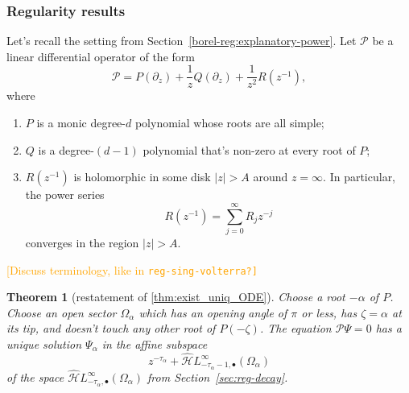 \documentclass{article}
\newcommand{\dualsingexp}[2]{\widehat{\mathcal{H}}L^\infty_{#1, #2}}
\newcommand{\dualsingexpalg}[1]{\dualsingexp{#1}{\bullet}}
\newcommand{\C}{\mathbb{C}}
\theoremstyle{definition}
\theoremstyle{plain}
\newtheorem{theorem}{Theorem}[section]
\begin{document}
\subsubsection{Regularity results}
Let's recall the setting from Section~\ref{borel-reg:explanatory-power}. Let $\mathcal{P}$ be a linear differential operator of the form
\begin{equation}\label{eqn:operator-P}
    \mathcal{P} = P(\partial_z) + \frac{1}{z} Q(\partial_z) + \frac{1}{z^2} R(z^{-1}),
\end{equation}
where
\begin{enumerate}
\item $P$ is a monic degree-$d$ polynomial whose roots are all simple; 
\item $Q$ is a degree-$(d-1)$ polynomial that's non-zero at every root of $P$;
\item $R(z^{-1})$ is holomorphic in some disk $|z| > A$ around $z = \infty$. In particular, the power series
\[ R(z^{-1}) = \sum_{j=0}^\infty R_j z^{-j} \]
converges in the region $|z| > A$.
\end{enumerate}
\textcolor{orange}{[Discuss terminology, like in \tt{reg-sing-volterra}?]}
\color{BlueViolet}
\begin{theorem}[restatement of \ref{thm:exist_uniq_ODE}]\label{thm:exist_uniq_ODE_proof}
Choose a root $-\alpha$ of $P$. Choose an open sector $\Omega_\alpha$ which has an opening angle of $\pi$ or less, has $\zeta = \alpha$ at its tip, and doesn't touch any other root of $P(-\zeta)$. The equation $\mathcal{P}\Psi = 0$ has a unique solution $\Psi_\alpha$ in the affine subspace
\[ z^{-\tau_\alpha} + \dualsingexpalg{-\tau_\alpha-1}(\Omega_\alpha) \]
of the space $\dualsingexpalg{-\tau_\alpha}(\Omega_\alpha)$ from Section~\ref{sec:reg-decay}.
\end{theorem}
\end{document}
